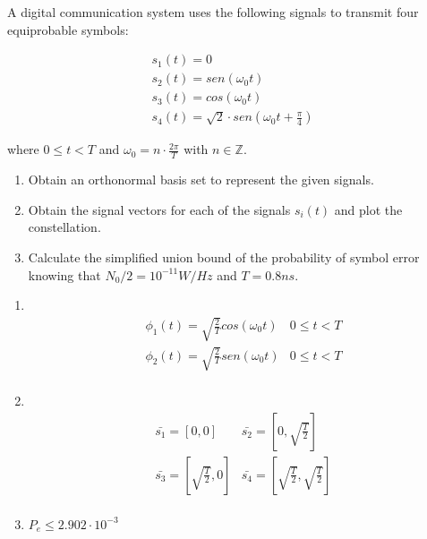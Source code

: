 \documentclass[idioma,boletin]{uah}
\begin{document}
{

	A digital communication system uses the following signals to transmit four equiprobable symbols:
	
	\begin{displaymath}
		\begin{array}{l}
			s_1(t) = 0 \\
			s_2(t) = sen \left ( \omega_0 t \right ) \\
			s_3(t) = cos \left ( \omega_0 t \right ) \\
			s_4(t) = \sqrt{2} \cdot sen \left ( \omega_0 t + \frac{\pi}{4} \right )
		\end{array}
	\end{displaymath}
	
	where $0 \leq t < T$ and $\omega_0 = n \cdot \frac{2\pi}{T}$ with $n \in \mathbb{Z}$.

	\begin{enumerate}
		\item Obtain an orthonormal basis set to represent the given signals.
		\item Obtain the signal vectors for each of the signals $s_i(t)$ and plot the constellation.
		\item Calculate the simplified union bound of the probability of symbol error knowing that $N_0/2=10^{-11} W/Hz$ and $T=0.8 ns$.
	\end{enumerate}
	
}
{

\begin{enumerate}
	\item \
	\begin{displaymath}
		\begin{array}{ll}
			\phi_1(t) = \sqrt{\frac{2}{T}} cos \left ( \omega_0 t  \right ) & 0 \leq t < T \\
			\phi_2(t) = \sqrt{\frac{2}{T}} sen \left ( \omega_0 t  \right ) & 0 \leq t < T \\
		\end{array}
	\end{displaymath}
	\item \
	\begin{displaymath}
		\begin{array}{ll}
			\bar{s_1} = \left [0, 0 \right ] & \bar{s_2} = \left [0, \sqrt{\frac{T}{2}} \right ] \\
			\bar{s_3} = \left [\sqrt{\frac{T}{2}}, 0 \right ] & \bar{s_4} = \left [\sqrt{\frac{T}{2}}, \sqrt{\frac{T}{2}} \right ]\\
		\end{array}
	\end{displaymath}
	\item $P_e \leq 2.902 \cdot 10^{-3}$
\end{enumerate}
}
\end{document}
